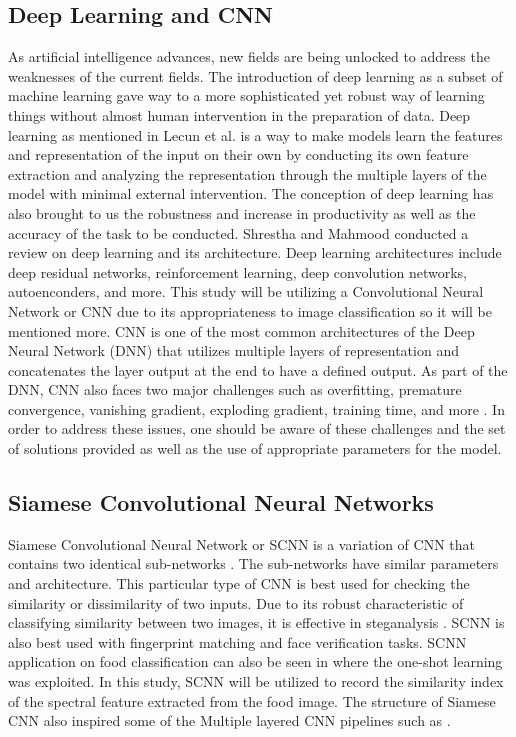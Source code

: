 \subsection{Deep Learning and CNN}
As artificial intelligence advances, new fields are being unlocked to address the weaknesses of the current fields. The introduction of deep learning as a subset of machine learning gave way to a more sophisticated yet robust way of learning things without almost human intervention in the preparation of data. Deep learning as mentioned in Lecun et al. \cite{lecun-2015} is a way to make models learn the features and representation of the input on their own by conducting its own feature extraction and analyzing the representation through the multiple layers of the model with minimal external intervention. The conception of deep learning has also brought to us the robustness and increase in productivity as well as the accuracy of the task to be conducted. Shrestha and Mahmood \cite{shrestha-2019} conducted a review on deep learning and its architecture. Deep learning architectures include deep residual networks, reinforcement learning, deep convolution networks, autoenconders, and more. This study will be utilizing a Convolutional Neural Network or CNN due to its appropriateness to image classification \cite{sarker-2021} so it will be mentioned more. CNN is one of the most common architectures of the Deep Neural Network (DNN) that utilizes multiple layers of representation and concatenates the layer output at the end to have a defined output. As part of the DNN, CNN also faces two major challenges such as overfitting, premature convergence, vanishing gradient, exploding gradient, training time, and more \cite{shrestha-2019}. In order to address these issues, one should be aware of these challenges and the set of solutions provided as well as the use of appropriate parameters for the model.
\subsection{Siamese Convolutional Neural Networks}
Siamese Convolutional Neural Network or SCNN is a variation of CNN that contains two identical sub-networks \cite{prasad-2021}. The sub-networks have similar parameters and architecture. This particular type of CNN is best used for checking the similarity or dissimilarity of two inputs. Due to its robust characteristic of classifying similarity between two images, it is effective in steganalysis \cite{you-2021}. SCNN is also best used with fingerprint matching and face verification tasks. SCNN application on food classification can also be seen in \cite{sarker-2019} where the one-shot learning was exploited. In this study, SCNN will be utilized to record the similarity index of the spectral feature extracted from the food image. The structure of Siamese CNN also inspired some of the Multiple layered CNN pipelines such as \cite{martinel-2018, pandey-2017}.
